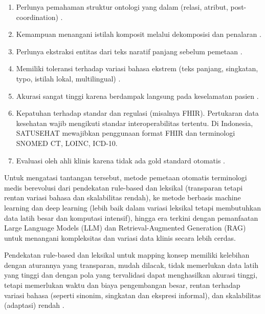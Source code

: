 \begin{enumerate}
    \item Perlunya pemahaman struktur ontologi yang dalam (relasi, atribut, post-coordination) \citep{kate_automatic_2020,park_development_2026}.
    \item Kemampuan menangani istilah komposit melalui dekomposisi dan penalaran \citep{gilani_cde-mapper_2025}.
    \item Perlunya ekstraksi entitas dari teks naratif panjang sebelum pemetaan \citep{eslami_hybrid_2026,peterson_automating_2020}.
    \item Memiliki toleransi terhadap variasi bahasa ekstrem (teks panjang, singkatan, typo, istilah lokal, multilingual) \citep{chen_automatic_2022}.
    \item Akurasi sangat tinggi karena berdampak langsung pada keselamatan pasien \citep{yu_large_2026}.
    \item Kepatuhan terhadap standar dan regulasi (misalnya FHIR). Pertukaran data kesehatan wajib mengikuti standar interoperabilitas tertentu. Di Indonesia, SATUSEHAT mewajibkan penggunaan format FHIR dan terminologi SNOMED CT, LOINC, ICD-10.
    \item Evaluasi oleh ahli klinis karena tidak ada gold standard otomatis \citep{chen_automatic_2022,eslami_hybrid_2026,gilani_cde-mapper_2025}.
\end{enumerate}

Untuk mengatasi tantangan tersebut, metode pemetaan otomatis terminologi medis berevolusi dari pendekatan rule-based dan leksikal (transparan tetapi rentan variasi bahasa dan skalabilitas rendah), ke metode berbasis machine learning dan deep learning (lebih baik dalam variasi leksikal tetapi membutuhkan data latih besar dan komputasi intensif), hingga era terkini dengan pemanfaatan Large Language Models (LLM) dan Retrieval-Augmented Generation (RAG) untuk menangani kompleksitas dan variasi data klinis secara lebih cerdas.

Pendekatan rule-based dan leksikal untuk mapping konsep memiliki kelebihan dengan aturannya yang transparan, mudah dilacak, tidak memerlukan data latih yang tinggi dan dengan pola yang tervalidasi dapat menghasilkan akurasi tinggi, tetapi memerlukan waktu dan biaya pengembangan besar, rentan terhadap variasi bahasa (seperti sinonim, singkatan dan ekspresi informal), dan skalabilitas (adaptasi) rendah \citep{kim_automating_2014,meizoso_automated_2011}.

